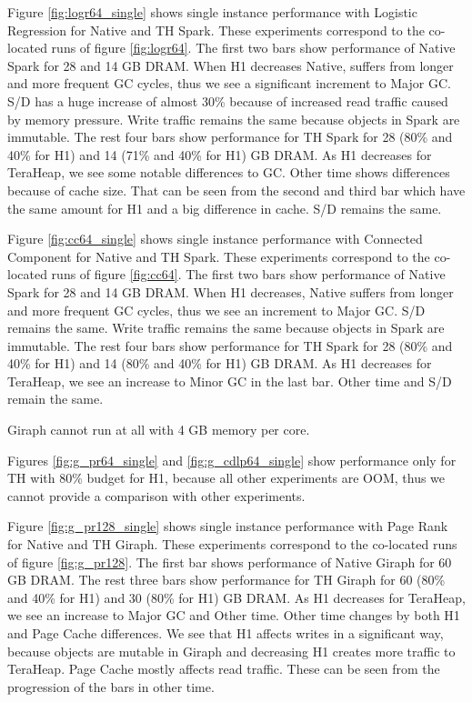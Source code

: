 Figure \ref{fig:logr64_single} shows single instance performance with Logistic Regression for Native and TH Spark. These experiments correspond to the co-located runs of figure \ref{fig:logr64}. The first two bars show performance of Native Spark for 28 and 14 GB DRAM. When H1 decreases Native, suffers from longer and more frequent GC cycles, thus we see a significant increment to Major GC. S/D has a huge increase of almost 30\% because of increased read traffic caused by memory pressure. Write traffic remains the same because objects in Spark are immutable. The rest four bars show performance for TH Spark for 28 (80\% and 40\% for H1) and 14 (71\% and 40\% for H1) GB DRAM. As H1 decreases for TeraHeap, we see some notable differences to GC. Other time shows differences because of cache size. That can be seen from the second and third bar which have the same amount for H1 and a big difference in cache. S/D remains the same.

Figure \ref{fig:cc64_single} shows single instance performance with Connected Component for Native and TH Spark. These experiments correspond to the co-located runs of figure \ref{fig:cc64}. The first two bars show performance of Native Spark for 28 and 14 GB DRAM. When H1 decreases, Native suffers from longer and more frequent GC cycles, thus we see an increment to Major GC. S/D remains the same. Write traffic remains the same because objects in Spark are immutable. The rest four bars show performance for TH Spark for 28 (80\% and 40\% for H1) and 14 (80\% and 40\% for H1) GB DRAM. As H1 decreases for TeraHeap, we see an increase to Minor GC in the last bar. Other time and S/D remain the same.

Giraph cannot run at all with 4 GB memory per core.

Figures \ref{fig:g_pr64_single} and \ref{fig:g_cdlp64_single} show performance only for TH with 80\% budget for H1, because all other experiments are OOM, thus  we cannot provide a comparison with other experiments.

Figure \ref{fig:g_pr128_single} shows single instance performance with Page Rank for Native and TH Giraph. These experiments correspond to the co-located runs of figure \ref{fig:g_pr128}. The first bar shows performance of Native Giraph for 60 GB DRAM. The rest three bars show performance for TH Giraph for 60 (80\% and 40\% for H1) and 30 (80\% for H1) GB DRAM. As H1 decreases for TeraHeap, we see an increase to Major GC  and Other time. Other time changes by both H1 and Page Cache differences. We see that H1 affects writes in a significant way, because objects are mutable in Giraph and decreasing H1 creates more traffic to TeraHeap. Page Cache mostly affects read traffic. These can be seen from the progression of the bars in other time.

